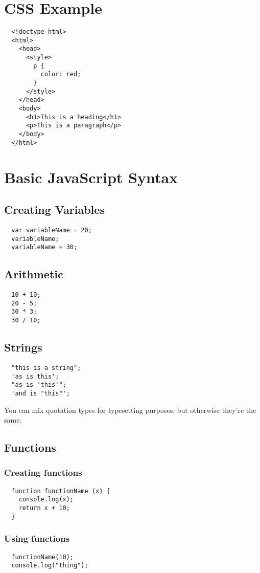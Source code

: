 \documentclass[letterpage,foldmark,10pt,notumble]{leaflet}
\begin{document}
\section{CSS Example}
\begin{verbatim}
  <!doctype html>
  <html>
    <head>
      <style>
        p {
          color: red;
        }
      </style>
    </head>
    <body>
      <h1>This is a heading</h1>
      <p>This is a paragraph</p>
    </body>
  </html>
\end{verbatim}
\section{Basic JavaScript Syntax}
\subsection{Creating Variables}
\begin{verbatim}
  var variableName = 20;
  variableName;
  variableName = 30;
\end{verbatim}
\subsection{Arithmetic}
\begin{verbatim}
  10 + 10;
  20 - 5;
  30 * 3;
  30 / 10;
\end{verbatim}
\subsection{Strings}
\begin{verbatim}
  "this is a string";
  'as is this';
  "as is 'this'";
  'and is "this"';
\end{verbatim}
\begin{framed}
  You can mix quotation types for typesetting purposes, but otherwise they're the same.
\end{framed}
\subsection{Functions}
\subsubsection{Creating functions}
\begin{verbatim}
  function functionName (x) {
    console.log(x);
    return x + 10;
  }
\end{verbatim}
\subsubsection{Using functions}
\begin{verbatim}
  functionName(10);
  console.log("thing");
\end{verbatim}
\end{document}
